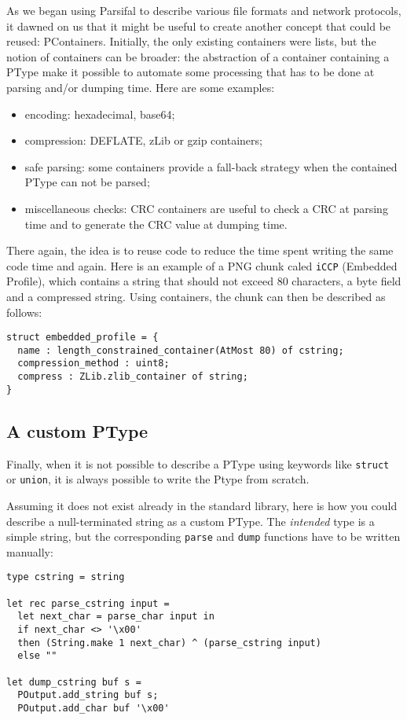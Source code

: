 \documentclass[conference]{IEEEtran}
\begin{document}
As we began using Parsifal to describe various file formats and
network protocols, it dawned on us that it might be useful to create
another concept that could be reused: PContainers. Initially, the only
existing containers were lists, but the notion of containers can be
broader: the abstraction of a container containing a PType make it
possible to automate some processing that has to be done at parsing
and/or dumping time. Here are some examples:
\begin{itemize}
\item encoding: hexadecimal, base64;
\item compression: DEFLATE, zLib or gzip containers;
\item safe parsing: some containers provide a fall-back strategy when
  the contained PType can not be parsed;
\item miscellaneous checks: CRC containers are useful to check a CRC
  at parsing time and to generate the CRC value at dumping time.
\end{itemize}

There again, the idea is to reuse code to reduce the time spent
writing the same code time and again.  Here is an example of a PNG
chunk caled \texttt{iCCP} (Embedded Profile), which contains a string
that should not exceed 80 characters, a byte field and a compressed
string. Using containers, the chunk can then be described as follows:

\begin{lstlisting}
struct embedded_profile = {
  name : length_constrained_container(AtMost 80) of cstring;
  compression_method : uint8;
  compress : ZLib.zlib_container of string;
}
\end{lstlisting}


\subsection{A custom PType}

Finally, when it is not possible to describe a PType using keywords
like \texttt{struct} or \texttt{union}, it is always possible to write
the Ptype from scratch.

Assuming it does not exist already in the standard library, here is
how you could describe a null-terminated string as a custom PType. The
\emph{intended} type is a simple string, but the corresponding
\texttt{parse} and \texttt{dump} functions have to be written manually:
\begin{lstlisting}
type cstring = string

let rec parse_cstring input =
  let next_char = parse_char input in
  if next_char <> '\x00'
  then (String.make 1 next_char) ^ (parse_cstring input)
  else ""

let dump_cstring buf s =
  POutput.add_string buf s;
  POutput.add_char buf '\x00'
\end{lstlisting}
\end{document}
